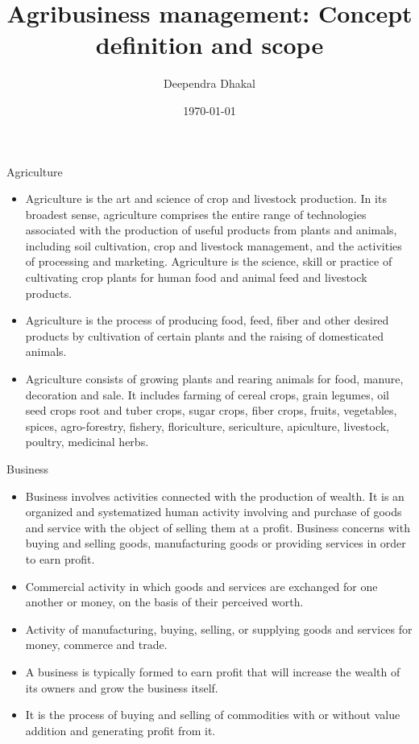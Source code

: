 \documentclass[12pt,ignorenonframetext,aspectratio=169]{beamer}
\title{\insertsectionhead}
  {
    \definecolor{white}{rgb}{0.776,0.357,0.157}
    \definecolor{iqss@orange}{rgb}{1,1,1}
    \ifnum \insertmainframenumber > \insertframenumber
    \frame{
      \frametitle{\iqsssectiontitleheader}
      \tableofcontents[currentsection]
    }
    \else
    \frame{
      \frametitle{Backup Slides}
      \tableofcontents[sectionstyle=shaded/shaded,subsectionstyle=shaded/shaded/shaded]
    }
    \fi
  }
\title[]{Agribusiness management: Concept definition and scope}
\author[
        Deependra Dhakal
    ]{Deependra Dhakal}
\institute[
    ]{
    GAASC, Baitadi \and Tribhuwan University
    }
\date[
      \today
  ]{
      \today
        }
\providecommand{\tightlist}{%
  \setlength{\itemsep}{0pt}\setlength{\parskip}{0pt}}
\begin{document}
  \begin{frame}[plain]
  \titlepage
  \end{frame}



\begin{frame}{Agriculture}
\protect\hypertarget{agriculture}{}
\footnotesize

\begin{itemize}
\tightlist
\item
  Agriculture is the art and science of crop and livestock production.
  In its broadest sense, agriculture comprises the entire range of
  technologies associated with the production of useful products from
  plants and animals, including soil cultivation, crop and livestock
  management, and the activities of processing and marketing.
  Agriculture is the science, skill or practice of cultivating crop
  plants for human food and animal feed and livestock products.
\item
  Agriculture is the process of producing food, feed, fiber and other
  desired products by cultivation of certain plants and the raising of
  domesticated animals.
\item
  Agriculture consists of growing plants and rearing animals for food,
  manure, decoration and sale. It includes farming of cereal crops,
  grain legumes, oil seed crops root and tuber crops, sugar crops, fiber
  crops, fruits, vegetables, spices, agro-forestry, fishery,
  floriculture, sericulture, apiculture, livestock, poultry, medicinal
  herbs.
\end{itemize}
\end{frame}

\begin{frame}{Business}
\protect\hypertarget{business}{}
\footnotesize

\begin{itemize}
\tightlist
\item
  Business involves activities connected with the production of wealth.
  It is an organized and systematized human activity involving and
  purchase of goods and service with the object of selling them at a
  profit. Business concerns with buying and selling goods, manufacturing
  goods or providing services in order to earn profit.
\item
  Commercial activity in which goods and services are exchanged for one
  another or money, on the basis of their perceived worth.
\item
  Activity of manufacturing, buying, selling, or supplying goods and
  services for money, commerce and trade.
\item
  A business is typically formed to earn profit that will increase the
  wealth of its owners and grow the business itself.
\item
  It is the process of buying and selling of commodities with or without
  value addition and generating profit from it.
\end{itemize}
\end{frame}
\end{document}
